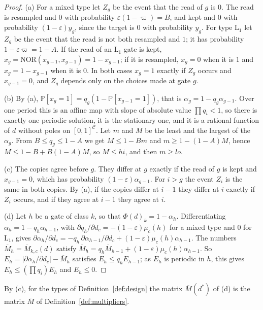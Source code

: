\documentclass[11pt]{amsart}
\theoremstyle{definition}
\theoremstyle{remark}
\newcommand{\eps}{\varepsilon}
\newcommand{\NOR}{\mathrm{NOR}}
\newcommand{\PP}{\mathbb{P}}
\begin{document}
\begin{proof}
(a) For a mixed type let $Z_g$ be the event that the read of $g$ is $0$. The read is resampled
and $0$ with probability $\eps(1-\varpi)=B$, and kept and $0$ with probability $(1-\eps)y_g$,
since the target is $0$ with probability $y_g$. For type $\mathrm L_1$ let $Z_g$ be the event that
the read is not both resampled and $1$; it has probability $1-\eps\varpi=1-A$. If the read of an
$\mathrm L_1$ gate is kept, $x_g=\NOR(x_{g-1},x_{g-1})=1-x_{g-1}$; if it is resampled, $x_g=0$
when it is $1$ and $x_g=1-x_{g-1}$ when it is $0$. In both cases $x_g=1$ exactly if $Z_g$ occurs
and $x_{g-1}=0$, and $Z_g$ depends only on the choices made at gate $g$.

(b) By (a), $\PP[x_g=1]=q_g(1-\PP[x_{g-1}=1])$, that is $\alpha_g=1-q_g\alpha_{g-1}$. Over one
period this is an affine map with slope of absolute value $\prod q_i<1$, so there is exactly one
periodic solution, it is the stationary one, and it is a rational function of $d$ without poles
on $[0,1]^{\mathcal C}$. Let $m$ and $M$ be the least and the largest of the $\alpha_g$. From
$B\le q_g\le1-A$ we get $M\le1-Bm$ and $m\ge1-(1-A)M$, hence $M\le1-B+B(1-A)M$, so $M\le hi$, and
then $m\ge lo$.

(c) The copies agree before $g$. They differ at $g$ exactly if the read of $g$ is kept and
$x_{g-1}=0$, which has probability $(1-\eps)\alpha_{g-1}$. For $i>g$ the event $Z_i$ is the same
in both copies. By (a), if the copies differ at $i-1$ they differ at $i$ exactly if $Z_i$ occurs,
and if they agree at $i-1$ they agree at $i$.

(d) Let $h$ be a gate of class $k$, so that $\Phi(d)_k=1-\alpha_h$. Differentiating
$\alpha_h=1-q_h\alpha_{h-1}$, with $\partial q_h/\partial d_c=-(1-\eps)\mu_c(h)$ for a mixed type
and $0$ for $\mathrm L_1$, gives
$\partial\alpha_h/\partial d_c=-q_h\,\partial\alpha_{h-1}/\partial d_c+(1-\eps)\mu_c(h)\alpha_{h-1}$.
The numbers $\overline M_h=\overline M_{k,c}(d)$ satisfy
$\overline M_h=q_h\overline M_{h-1}+(1-\eps)\mu_c(h)\alpha_{h-1}$. So
$E_h=|\partial\alpha_h/\partial d_c|-\overline M_h$ satisfies $E_h\le q_hE_{h-1}$; as $E_h$ is
periodic in $h$, this gives $E_h\le(\prod q_i)E_h$ and $E_h\le0$.
\end{proof}

\noindent By (c), for the types of Definition~\ref{def:design} the matrix $\overline M(d^*)$ of
(d) is the matrix $\overline M$ of Definition~\ref{def:multipliers}.
\end{document}
